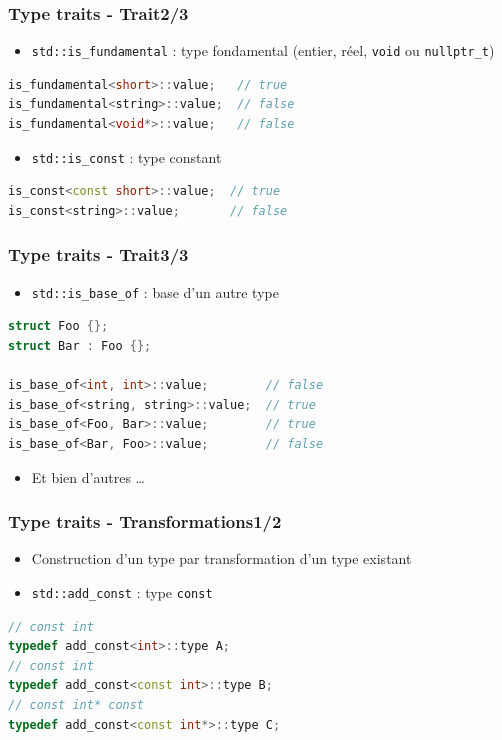 \documentclass[C++.tex]{subfiles}
\begin{document}
\begin{frame}[fragile]
	\frametitle{Type traits - Trait\titlehfill{}2/3}
	\begin{itemize}
		\item \lstinline|std::is_fundamental| : type fondamental (entier, réel, \lstinline|void| ou \lstinline|nullptr_t|)
	\end{itemize}

	\begin{lstlisting}[language=C++]
is_fundamental<short>::value;   // true
is_fundamental<string>::value;  // false
is_fundamental<void*>::value;   // false\end{lstlisting}

	\begin{itemize}
		\item \lstinline|std::is_const| : type constant
	\end{itemize}

	\begin{lstlisting}[language=C++]
is_const<const short>::value;  // true
is_const<string>::value;       // false\end{lstlisting}
\end{frame}

\begin{frame}[fragile]
	\frametitle{Type traits - Trait\titlehfill{}3/3}
	\begin{itemize}
		\item \lstinline|std::is_base_of| : base d'un autre type
	\end{itemize}

	\begin{lstlisting}[language=C++]
struct Foo {};
struct Bar : Foo {};

is_base_of<int, int>::value;        // false
is_base_of<string, string>::value;  // true
is_base_of<Foo, Bar>::value;        // true
is_base_of<Bar, Foo>::value;        // false\end{lstlisting}

	\begin{itemize}
		\item Et bien d'autres \ldots
	\end{itemize}
\end{frame}

\begin{frame}[fragile]
	\frametitle{Type traits - Transformations\titlehfill{}1/2}
	\begin{itemize}
		\item Construction d'un type par transformation d'un type existant
		\item \lstinline|std::add_const| : type \lstinline|const|
	\end{itemize}

	\begin{lstlisting}[language=C++]
// const int
typedef add_const<int>::type A;
// const int
typedef add_const<const int>::type B;
// const int* const
typedef add_const<const int*>::type C;\end{lstlisting}
\end{frame}
\end{document}
